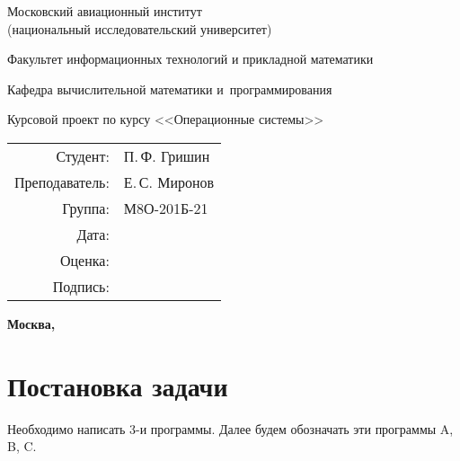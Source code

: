 \documentclass[pdf, unicode, 12pt, a4paper,oneside,fleqn]{article}
\begin{document}
\begin{titlepage}
    \begin{center}
        \bfseries

        {\Large Московский авиационный институт\\ (национальный исследовательский университет)}
        
        \vspace{48pt}
        
        {\large Факультет информационных технологий и прикладной математики}
        
        \vspace{36pt}
        
        {\large Кафедра вычислительной математики и~программирования}
        
        \vspace{48pt}
        
        Курсовой проект по курсу <<Операционные системы>>

    \end{center}
    
    \vspace{140pt}
    
    \begin{flushright}
    \begin{tabular}{rl}
    Студент: & П.\,Ф. Гришин \\
    Преподаватель: & Е.\,С. Миронов \\
    Группа: & М8О-201Б-21 \\
    Дата: & \\
    Оценка: & \\
    Подпись: & \\
    \end{tabular}
    \end{flushright}
    
    \vfill
    
    \begin{center}
    \bfseries
    Москва, \the\year
    \end{center}
\end{titlepage}
    
\pagebreak

\section{Постановка задачи}

Необходимо написать 3-и программы. Далее будем обозначать эти программы A, B, C.
\end{document}
